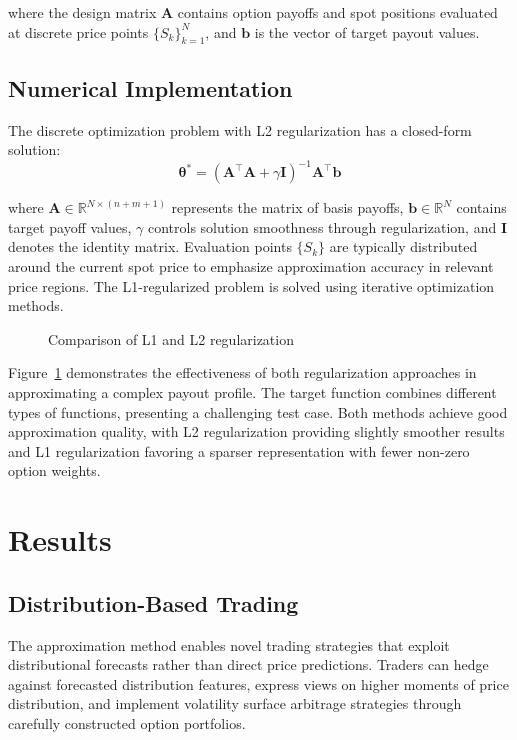 \documentclass[12pt]{article}
\begin{document}
where the design matrix \( \mathbf{A} \) contains option payoffs and spot positions
evaluated at discrete price points \( \{S_k\}_{k=1}^N \), and \( \mathbf{b} \) is
the vector of target payout values.

\subsection{Numerical Implementation}
The discrete optimization problem with L2 regularization has a closed-form solution:
\begin{equation}
\boldsymbol{\theta}^* = 
    (\mathbf{A}^\top \mathbf{A} + \gamma \mathbf{I})^{-1} 
    \mathbf{A}^\top \mathbf{b}
\end{equation}

where $\mathbf{A} \in \mathbb{R}^{N \times (n+m+1)}$ represents the matrix of basis 
payoffs, $\mathbf{b} \in \mathbb{R}^N$ contains target payoff values, $\gamma$ 
controls solution smoothness through regularization, and $\mathbf{I}$ denotes the 
identity matrix. Evaluation points $\{S_k\}$ are typically distributed around the 
current spot price to emphasize approximation accuracy in relevant price regions. 
The L1-regularized problem is solved using iterative optimization methods.

\begin{figure}[htbp]
\centering

\caption{Comparison of L1 and L2 regularization}
\label{fig:regularization}
\end{figure}

Figure~\ref{fig:regularization} demonstrates the effectiveness of both regularization 
approaches in approximating a complex payout profile. The target function combines 
different types of functions, presenting a challenging test case. Both 
methods achieve good approximation quality, with L2 regularization providing slightly 
smoother results and L1 regularization favoring a sparser representation with fewer 
non-zero option weights.

\section{Results}
\subsection{Distribution-Based Trading}
The approximation method enables novel trading strategies that exploit distributional 
forecasts rather than direct price predictions. Traders can hedge against forecasted 
distribution features, express views on higher moments of price distribution, and 
implement volatility surface arbitrage strategies through carefully constructed 
option portfolios.
\end{document}
